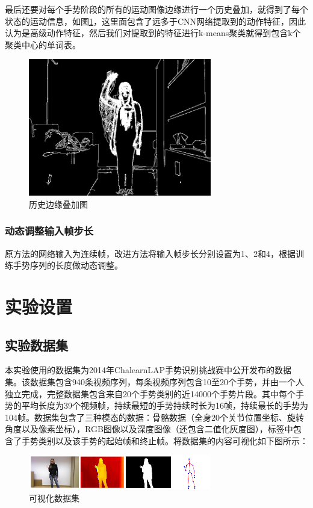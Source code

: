 \documentclass[a4paper, 12pt]{article}
\begin{document}
最后还要对每个手势阶段的所有的运动图像边缘进行一个历史叠加，就得到了每个状态的运动信息，如图\ref{fig:7}，这里面包含了远多于CNN网络提取到的动作特征，因此认为是高级动作特征，然后我们对提取到的特征进行k-means聚类就得到包含k个聚类中心的单词表。

\begin{figure}[ht]
  \centering
  \includegraphics[width=8cm]{combineresult.jpg}
  \caption{\label{fig:7}历史边缘叠加图}
\end{figure}

\subsubsection{动态调整输入帧步长}
原方法的网络输入为连续帧，改进方法将输入帧步长分别设置为1、2和4，根据训练手势序列的长度做动态调整。

\section{实验设置}
\subsection{实验数据集}
本实验使用的数据集为2014年ChalearnLAP手势识别挑战赛中公开发布的数据集。该数据集包含940条视频序列，每条视频序列包含10至20个手势，并由一个人独立完成，完整数据集包含来自20个手势类别的近14000个手势片段。其中每个手势的平均长度为39个视频帧，持续最短的手势持续时长为16帧，持续最长的手势为104帧。数据集包含了三种模态的数据：骨骼数据（全身20个关节位置坐标、旋转角度以及像素坐标），RGB图像以及深度图像（还包含二值化灰度图），标签中包含了手势类别以及该手势的起始帧和终止帧。将数据集的内容可视化如下图所示：

\begin{figure}[ht]
  \centering
  \includegraphics[width=8cm]{dataVisual.png}
  \caption{\label{fig:8}可视化数据集}
\end{figure}
\end{document}

